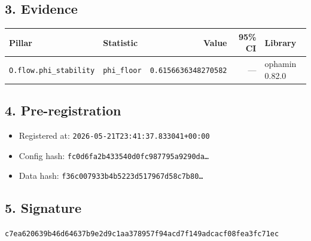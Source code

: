 \documentclass{article}
\begin{document}
\subsection*{3. Evidence}
\begin{tabular}{llrrl}\toprule
\textbf{Pillar} & \textbf{Statistic} & \textbf{Value} & \textbf{95\% CI} & \textbf{Library} \\\midrule
\texttt{O.flow.phi\_stability} & \texttt{phi\_floor} & \texttt{0.6156636348270582} & --- & ophamin 0.82.0 \\
\bottomrule\end{tabular}
\subsection*{4. Pre-registration}
\begin{itemize}
\item Registered at: \texttt{2026-05-21T23:41:37.833041+00:00}
\item Config hash: \texttt{fc0d6fa2b433540d0fc987795a9290da\dots}
\item Data hash: \texttt{f36c007933b4b5223d517967d58c7b80\dots}
\end{itemize}
\subsection*{5. Signature}
\texttt{c7ea620639b46d64637b9e2d9c1aa378957f94acd7f149adcacf08fea3fc71ec}\\
\end{document}
